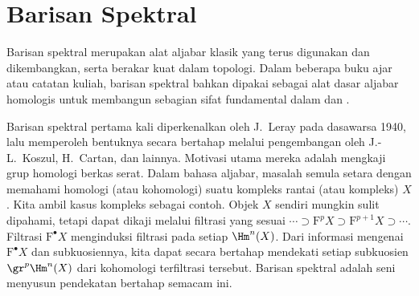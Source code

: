 
\chapter{Barisan Spektral}\label{sec:ss}
\hypertarget{o014.aljabr2.chapter5.intro-filtration-grading}{ }

Barisan spektral merupakan alat aljabar klasik yang terus digunakan dan
dikembangkan, serta berakar kuat dalam topologi. Dalam beberapa buku
ajar atau catatan kuliah, barisan spektral bahkan dipakai sebagai alat dasar
aljabar homologis untuk membangun sebagian sifat fundamental dalam
 dan .

Barisan spektral pertama kali diperkenalkan oleh J.\ Leray pada dasawarsa 1940,
lalu memperoleh bentuknya secara bertahap melalui pengembangan oleh J.-L.\
Koszul, H.\ Cartan, dan lainnya. Motivasi utama mereka adalah mengkaji grup
homologi berkas serat. Dalam bahasa aljabar, masalah semula setara dengan
memahami homologi (atau kohomologi) suatu kompleks rantai (atau kompleks)
$X$. Kita ambil kasus kompleks sebagai contoh. Objek $X$ sendiri mungkin sulit
dipahami, tetapi dapat dikaji melalui filtrasi yang sesuai
$\cdots\supset\mathrm{F}^pX\supset\mathrm{F}^{p+1}X\supset\cdots$.
Filtrasi $\mathrm{F}^\bullet X$ menginduksi filtrasi pada setiap $\Hm^n(X)$.
Dari informasi mengenai $\mathrm{F}^\bullet X$ dan subkuosiennya, kita dapat
secara bertahap mendekati setiap subkuosien
$\gr^p\Hm^n(X)$ dari kohomologi terfiltrasi tersebut. Barisan spektral adalah
seni menyusun pendekatan bertahap semacam ini.


